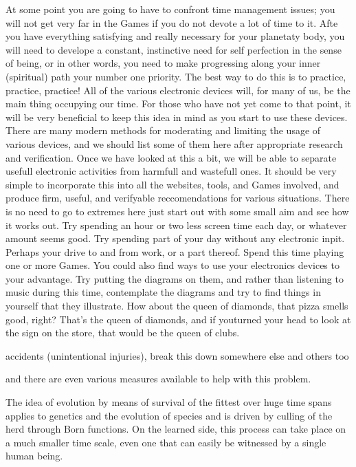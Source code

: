 \documentclass[12pt,letterpaper]{book}
\begin{document}
At some point you are going to have to confront time management issues; you will not get very far in the Games if you do not devote a lot of time to it. Afte you have everything satisfying and really necessary for your planetaty body, you will need to develope a constant, instinctive need for self perfection in the sense of being, or in other words, you need to make progressing along your inner (spiritual) path your number one priority. The best way to do this is to practice, practice, practice! All of the various electronic devices will, for many of us, be the main thing occupying our time. For those who have not yet come to that point, it will be very beneficial to keep this idea in mind as you start to use these devices. There are many modern methods for moderating and limiting the usage of various devices, and we should list some of them here after appropriate research and verification. Once we have looked at this a bit, we will be able to separate usefull electronic activities from harmfull and wastefull ones. It should be very simple to incorporate this into all the websites, tools, and Games involved, and produce firm, useful, and verifyable reccomendations for various situations. There is no need to go to extremes here just start out with some small aim and see how it works out. Try spending an hour or two less screen time each day, or whatever amount seems good. Try spending part of your day without any electronic inpit. Perhaps your drive to and from work, or a part thereof. Spend this time playing one or more Games. You could also find ways to use your electronics devices to your advantage. Try putting the diagrams on them, and rather than listening to music during this time, contemplate the diagrams and try to find things in yourself that they illustrate. How about the queen of diamonds, that pizza smells good, right? That's the queen of diamonds, and if youturned your head to look at the sign on the store, that would be the queen of clubs. 

accidents (unintentional injuries), break this down somewhere else and others too

and there are even various measures available to help with this problem. 

The idea of evolution by means of survival of the fittest over huge time spans applies to genetics and the evolution of species and is driven by culling of the herd through Born functions. On the learned side, this process can take place on a much smaller time scale, even one that can easily be witnessed by a single human being.
\end{document}
